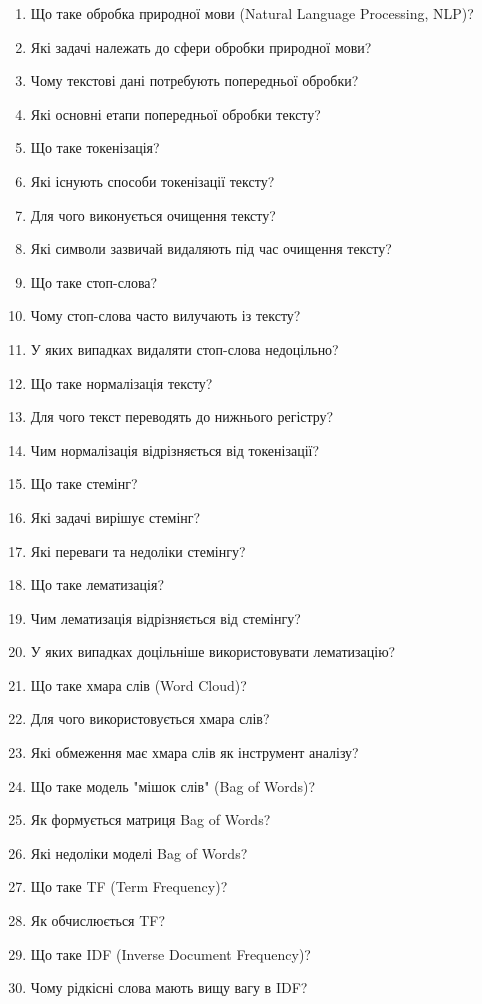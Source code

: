 \begin{enumerate}
\item Що таке обробка природної мови (Natural Language Processing, NLP)?
\item Які задачі належать до сфери обробки природної мови?
\item Чому текстові дані потребують попередньої обробки?
\item Які основні етапи попередньої обробки тексту?
\item Що таке токенізація?
\item Які існують способи токенізації тексту?
\item Для чого виконується очищення тексту?
\item Які символи зазвичай видаляють під час очищення тексту?
\item Що таке стоп-слова?
\item Чому стоп-слова часто вилучають із тексту?
\item У яких випадках видаляти стоп-слова недоцільно?
\item Що таке нормалізація тексту?
\item Для чого текст переводять до нижнього регістру?
\item Чим нормалізація відрізняється від токенізації?
\item Що таке стемінг?
\item Які задачі вирішує стемінг?
\item Які переваги та недоліки стемінгу?
\item Що таке лематизація?
\item Чим лематизація відрізняється від стемінгу?
\item У яких випадках доцільніше використовувати лематизацію?
\item Що таке хмара слів (Word Cloud)?
\item Для чого використовується хмара слів?
\item Які обмеження має хмара слів як інструмент аналізу?
\item Що таке модель "мішок слів" (Bag of Words)?
\item Як формується матриця Bag of Words?
\item Які недоліки моделі Bag of Words?
\item Що таке TF (Term Frequency)?
\item Як обчислюється TF?
\item Що таке IDF (Inverse Document Frequency)?
\item Чому рідкісні слова мають вищу вагу в IDF?

\end{enumerate}
